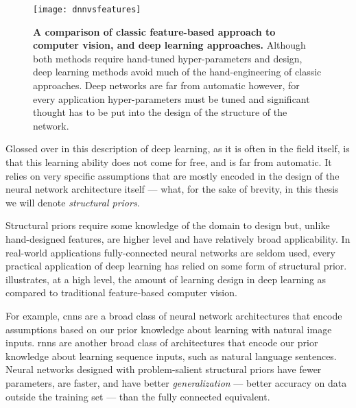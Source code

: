 \documentclass[thesis]{subfiles}
\begin{document}
\begin{figure}[tbp]
	\centering
	\texttt{[image: dnnvsfeatures]}
	\caption[Classic feature-based approach \vs{}deep learning.]{\textbf{A comparison of classic feature-based approach to computer vision, and deep learning approaches.} Although both methods require hand-tuned hyper-parameters and design, deep learning methods avoid much of the hand-engineering of classic approaches. Deep networks are far from automatic however, for every application hyper-parameters must be tuned and significant thought has to be put into the design of the structure of the network.}\label{dnnvsfeatures}
\end{figure}
	
Glossed over in this description of deep learning, as it is often in the field itself, is that this learning ability does not come for free, and is far from automatic. It relies on very specific assumptions that are mostly encoded in the design of the neural network architecture itself --- what, for the sake of brevity, in this thesis we will denote \emph{structural priors}.

Structural priors require some knowledge of the domain to design but, unlike hand-designed features, are higher level and have relatively broad applicability. In real-world applications fully-connected neural networks are seldom used, every practical application of deep learning has relied on some form of structural prior.  illustrates, at a high level, the amount of learning \vs{}design in deep learning as compared to traditional feature-based computer vision.

For example, \glspl{cnn} are a broad class of neural network architectures that encode assumptions based on our prior knowledge about learning with natural image inputs. \Glspl{rnn} are another broad class of architectures that encode our prior knowledge about learning sequence inputs, such as natural language sentences. Neural networks designed with problem-salient structural priors have fewer parameters, are faster, and have better \emph{generalization} --- better accuracy on data outside the training set --- than the fully connected equivalent.
\end{document}
